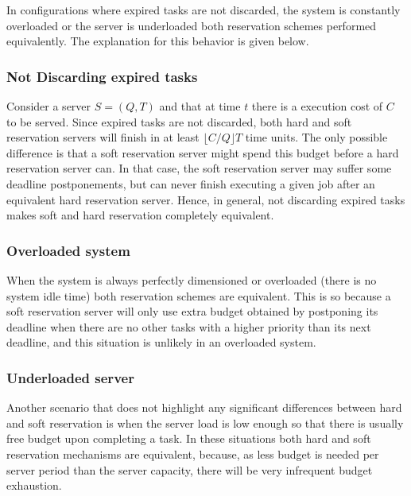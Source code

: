 \documentclass[times, 10pt,twocolumn]{article}
\begin{document}
\label{sec:noDifference}

In configurations where expired tasks are not discarded, the system is
constantly overloaded or the server is underloaded both reservation
schemes performed equivalently. The explanation for this behavior is
given below.

\subsubsection{Not Discarding expired tasks}
\label{sec:disc-expir-tasks}

Consider a server $S = (Q,T)$ and that at time $t$ there is a
execution cost of $C$ to be served.  Since expired tasks are not
discarded, both hard and soft reservation servers will finish in at
least $\lfloor C/Q \rfloor T$ time units.  The only possible
difference is that a soft reservation server might spend this budget
before a hard reservation server can. In that case, the soft
reservation server may suffer some deadline postponements, but can
never finish executing a given job after an equivalent hard
reservation server. Hence, in general, not discarding expired tasks
makes soft and hard reservation completely equivalent.

\subsubsection{Overloaded system}
\label{sec:system-load}

When the system is always perfectly dimensioned or overloaded (there
is no system idle time) both reservation schemes are equivalent. This
is so because a soft reservation server will only use extra budget
obtained by postponing its deadline when there are no other tasks with
a higher priority than its next deadline, and this situation is
unlikely in an overloaded system.

\subsubsection{Underloaded server}
\label{sec:server-load}

Another scenario that does not highlight any significant differences
between hard and soft reservation is when the server load is low
enough so that there is usually free budget upon completing a task. In
these situations both hard and soft reservation mechanisms are
equivalent, because, as less budget is needed per server period than
the server capacity, there will be very infrequent budget
exhaustion.
\end{document}
